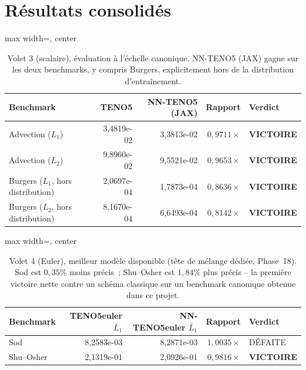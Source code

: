 \documentclass[11pt]{article}
\begin{document}
\section{Résultats consolidés}
\label{sec:consolide}

\begin{table}[htbp]
\begin{adjustbox}{max width=\textwidth, center}
\begin{tabular}{lrrrl}
\toprule
\textbf{Benchmark} & \textbf{TENO5} & \textbf{NN-TENO5 (JAX)} & \textbf{Rapport} & \textbf{Verdict} \\
\midrule
Advection ($L_1$) & 3,4819e-02 & 3,3813e-02 & $0,9711\times$ & \textbf{VICTOIRE} \\
\rowrule
Advection ($L_2$) & 9,8960e-02 & 9,5521e-02 & $0,9653\times$ & \textbf{VICTOIRE} \\
\rowrule
Burgers ($L_1$, hors distribution) & 2,0697e-04 & 1,7873e-04 & $0,8636\times$ & \textbf{VICTOIRE} \\
\rowrule
Burgers ($L_2$, hors distribution) & 8,1670e-04 & 6,6493e-04 & $0,8142\times$ & \textbf{VICTOIRE} \\
\bottomrule
\end{tabular}
\end{adjustbox}
\caption{Volet 3 (scalaire), évaluation à l'échelle canonique. NN-TENO5
(JAX) gagne sur les deux benchmarks, y compris Burgers, explicitement
hors de la distribution d'entraînement.\label{tab:volet3}}
\end{table}

\begin{table}[htbp]
\begin{adjustbox}{max width=\textwidth, center}
\begin{tabular}{lrrrl}
\toprule
\textbf{Benchmark} & \textbf{TENO5euler $\bar L_1$} & \textbf{NN-TENO5euler $\bar L_1$} & \textbf{Rapport} & \textbf{Verdict} \\
\midrule
Sod & 8,2583e-03 & 8,2871e-03 & $1,0035\times$ & DÉFAITE \\
\rowrule
Shu--Osher & 2,1319e-01 & 2,0926e-01 & $0,9816\times$ & \textbf{VICTOIRE} \\
\bottomrule
\end{tabular}
\end{adjustbox}
\caption{Volet 4 (Euler), meilleur modèle disponible (tête de mélange
dédiée, Phase~18). Sod est $0,35\%$ moins précis~; Shu--Osher est
$1,84\%$ plus précis -- la première victoire nette contre un schéma
classique sur un benchmark canonique obtenue dans ce projet.}
\end{table}
\end{document}
